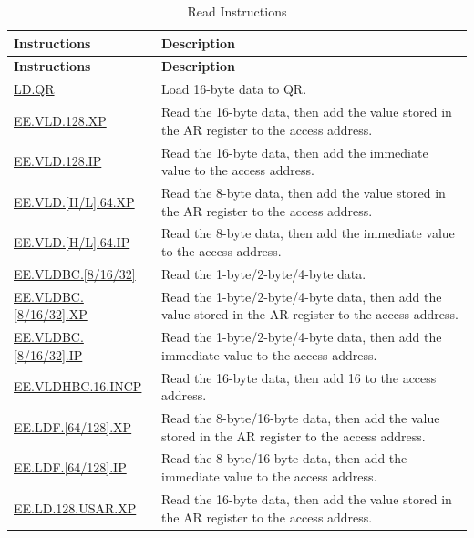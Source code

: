 \begin{longtable}[c]{|l|m{12cm}|}
    \caption{Read Instructions}
    \label{tab:pie-load-instructions}\\
    \hline
    \rowcolor{lightgray}
    \textbf{Instructions} & \textbf{Description} \\\hline
    \endfirsthead
    \rowcolor{lightgray}
    \textbf{Instructions} & \textbf{Description} \\\hline
    \endhead
    \endfoot
    
    \hyperref[instruction:LDQR]{LD.QR} & Load 16-byte data to QR.
    \\\hline
    \hyperref[instruction:EEVLD128XP]{EE.VLD.128.XP} & Read the 16-byte data, then add the value stored in the AR register to the access address.
    \\\hline
    \hyperref[instruction:EEVLD128IP]{EE.VLD.128.IP} & Read the 16-byte data, then add the immediate value to the access address.
    \\\hline
    \hyperref[instruction:EEVLDH64XP]{EE.VLD.[H/L].64.XP} & Read the 8-byte data, then add the value stored in the AR register to the access address.
    \\\hline
    \hyperref[instruction:EEVLDH64IP]{EE.VLD.[H/L].64.IP} & Read the 8-byte data, then add the immediate value to the access address.
    \\\hline
    \hyperref[instruction:EEVLDBC8]{EE.VLDBC.[8/16/32]} & Read the 1-byte/2-byte/4-byte data.
    \\\hline
    \hyperref[instruction:EEVLDBC8XP]{EE.VLDBC.[8/16/32].XP} & Read the 1-byte/2-byte/4-byte data, then add the value stored in the AR register to the access address.
    \\\hline
    \hyperref[instruction:EEVLDBC8IP]{EE.VLDBC.[8/16/32].IP} & Read the 1-byte/2-byte/4-byte data, then add the immediate value to the access address.
    \\\hline
    \hyperref[instruction:EEVLDHBC16INCP]{EE.VLDHBC.16.INCP} & Read the 16-byte data, then add 16 to the access address.
    \\\hline
    \hyperref[instruction:EELDF64XP]{EE.LDF.[64/128].XP} & Read the 8-byte/16-byte data, then add the value stored in the AR register to the access address.
    \\\hline
    \hyperref[instruction:EELDF64IP]{EE.LDF.[64/128].IP} & Read the 8-byte/16-byte data, then add the immediate value to the access address.
    \\\hline
    \hyperref[instruction:EELD128USARXP]{EE.LD.128.USAR.XP} & Read the 16-byte data, then add the value stored in the AR register to the access address.

\end{longtable}
